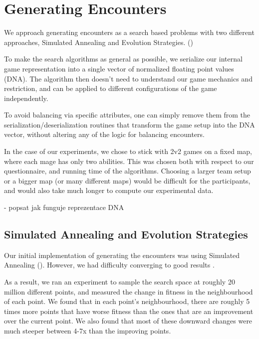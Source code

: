 \chapter{Generating Encounters}

We approach generating encounters as a search based problems with two
different approaches, Simulated Annealing and Evolution Strategies. ()

To make the search algorithms as general as possible, we serialize our
internal game representation into a single vector of normalized floating
point values (DNA). The algorithm then doesn't need to understand our game
mechanics and restriction, and can be applied to different configurations of
the game independently.

To avoid balancing via specific attributes, one can simply remove them from
the serialization/deserialization routines that transform the game setup into
the DNA vector, without altering any of the logic for balancing encounters.

In the case of our experiments, we chose to stick with 2v2 games on a fixed map,
where each mage has only two abilities. This was chosen both with respect to our
questionnaire, and running time of the algorithms. Choosing a larger team setup or
a bigger map (or many different maps) would be difficult for the participants,
and would also take much longer to compute our experimental data.


- popsat jak funguje reprezentace DNA

\section{Simulated Annealing and Evolution Strategies}

Our initial implementation of generating the encounters was using Simulated
Annealing (). However, we had difficulty converging to good
results .

As a result, we ran an experiment to sample the search space at roughly 20 million
different points, and measured the change in fitness in the neighbourhood of each point.
We found that in each point's neighbourhood, there are roughly 5 times more points that have
worse fitness than the ones that are an improvement over the current point. We also found that
most of these downward changes were much steeper between 4-7x than the improving points.

